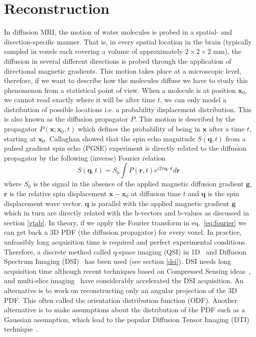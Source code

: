 \documentclass{bioinfo}
\begin{document}
\section{Reconstruction}\label{reconstruction}

In diffusion MRI, the motion of water molecules is probed in a spatial- and
direction-specific manner. That is, in every spatial location in the brain
(typically sampled in voxels each covering a volume of approximately
$2\times2\times2$ mm), the diffusion in several different directions is probed
through the application of directional magnetic gradients. This motion takes
place at a microscopic level, therefore, if we want to describe how the
molecules diffuse we have to study this phenomenon from a statistical
point of view. When a molecule is at position $\mathbf{x}_{0}$, we cannot read
exactly where it will be after time $t$, we can only model a distribution of
possible locations i.e. a probability displacement distribution. This is also
known as the diffusion propagator $P$. This motion is described by the
propagator $P(\mathbf{x};\mathbf{x}_{0},t)$ which defines the probability of
being in $\mathbf{x}$ after a time $t$, starting at $\mathbf{x}_{0}$. Callaghan
\citep{callaghan:91} showed that the spin echo magnitude
$S(\mathbf{q},t)$ from a pulsed gradient spin echo (PGSE) experiment is
directly related to the diffusion propagator by the following (inverse) Fourier
relation
\begin{equation}
S(\mathbf{q},t)=S_{0}\int P(\mathbf{r},t)e^{i2\pi\mathbf{q}\cdot\mathbf{r}}d\mathbf{r}\label{eq:fourier}
\end{equation}
\noindent where $S_{0}$ is the signal in the absence of the applied magnetic
diffusion gradient $\mathbf{g}$, $\mathbf{r}$ is the relative spin displacement
$\mathbf{x}-\mathbf{x}_{0}$ at diffusion time $t$ and $\mathbf{q}$ is the spin
displacement wave vector. $\mathbf{q}$ is parallel with the applied magnetic
gradient $\mathbf{g}$ which in turn are directly related with the b-vectors
and b-values as discussed in section \ref{gtab}.  In theory, if we apply the Fourier
transform in eq.~\ref{eq:fourier} we can get back a 3D PDF (the diffusion
propagator) for every voxel. In practice, unfeasibly long acquisition time is
required and perfect experimental conditions. Therefore, a discrete method
called q-space imaging (QSI) in 1D~\citep{callaghan-eccles-etal:1988}
and Diffusion  Spectrum Imaging (DSI)~\citep{wedeen2005mapping} has been used (see section
\ref{dsi}).
DSI needs long acquisition time although recent techniques based on
Compressed Sensing
ideas~\citep{menzel-tan-etal:11,bilgic2012accelerated,gramfort-etal-media:13},
and multi-slice imaging~\citep{Setsompop2012569} have
considerably accelerated the DSI acquisition. An alternative is to
work on reconstructing only an angular projection of the 3D PDF. This
often called the orientation distribution function (ODF). Another
alternative is to make assumptions about the distribution of the PDF
such as a Gaussian assumption, which lead to
the popular Diffusion Tensor Imaging (DTI)
technique~\citep{basser-mattiello-etal:94}.
\end{document}
